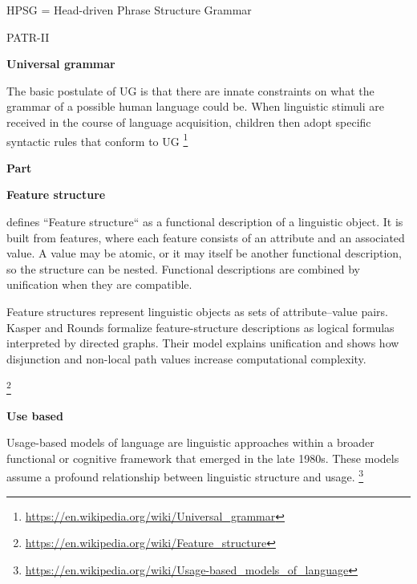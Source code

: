 \documentclass{book}
\providecommand{\ProjectDeepHeading}[2]{%
    \par\medskip\noindent\textbf{#2}\par\smallskip
}
\providecommand{\seeherefooter}[1]{\footnote{\url{#1}}}
\begin{document}
    HPSG = Head-driven Phrase Structure Grammar
    
    PATR-II

\ProjectDeepHeading{6}{Universal grammar}


The
    basic postulate of UG is that there are innate constraints on what the grammar of a possible human language could be. When linguistic stimuli are received in the course of language acquisition, children then adopt specific syntactic rules that conform to UG
    \seeherefooter{https://en.wikipedia.org/wiki/Universal_grammar}

\ProjectDeepHeading{7}{Part}

\ProjectDeepHeading{8}{Feature structure}


\cite{kay-1984-functional-unification-grammar} defines ``Feature structure`` as a functional description of a linguistic object. It is built from features, where each feature consists of an attribute and an associated value. A value may be atomic, or it may itself be another functional description, so the structure can be nested. Functional descriptions are combined by unification when they are compatible.
    
    Feature structures \cite{kasper-1986-a-logical-semantics-for-feature-structures} represent linguistic objects as sets of attribute--value pairs. Kasper and Rounds formalize feature-structure descriptions as logical formulas interpreted by directed graphs.
    Their model explains unification and shows how disjunction and non-local path values increase computational complexity.
    
        \seeherefooter{https://en.wikipedia.org/wiki/Feature_structure}

\ProjectDeepHeading{6}{Use based}


Usage-based models of language are linguistic approaches within a broader functional or cognitive framework that emerged in the late 1980s. These models assume a profound relationship between linguistic structure and usage. \seeherefooter{https://en.wikipedia.org/wiki/Usage-based_models_of_language}
\end{document}
